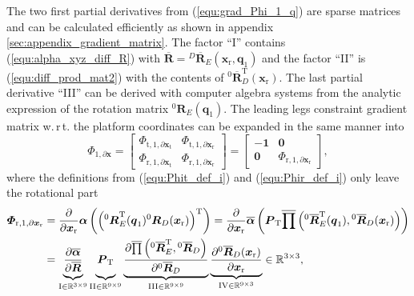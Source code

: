 \documentclass[robotics,article,accept,moreauthors,pdftex]{Definitions/mdpi}
\newcommand{\bm}[1]{\boldsymbol{#1}}
\newcommand{\rotmat}[2]{{{ }^{#1}\boldsymbol{R}}_{#2}}
\newcommand{\rotmato}[2]{{{ }^{#1}\boldsymbol{\overline{R}}}_{#2}}
\newcommand{\transp}[0]{{\mathrm{T}}}
\let\Phi\varPhi
\begin{document}
The two first partial derivatives from (\ref{equ:grad_Phi_1_q}) are sparse matrices and can be calculated efficiently as shown in appendix \ref{sec:appendix_gradient_matrix}.
The factor ``I'' contains (\ref{equ:alpha_xyz_diff_R}) with $\overline{\bm{R}}=\rotmato{D}{E}(\bm{x}_{\mathrm{r}},\bm{q}_1)$ and the factor ``II'' is (\ref{equ:diff_prod_mat2}) with the contents of $\rotmato{0}{D}^\transp(\bm{x}_{\mathrm{r}})$.
The last partial derivative ``III'' can be derived with computer algebra systems from the analytic expression of the rotation matrix $\rotmat{0}{E}(\bm{q}_1)$.
The leading legs constraint gradient matrix w.\,r\,t. the platform coordinates can be expanded in the same manner into
%
\begin{equation}
\bm{\Phi}_{1,\partial\bm{x}}
=
\begin{bmatrix}
\bm{\Phi}_{\mathrm{t},1,\partial\bm{x}_\mathrm{t}} & \bm{\Phi}_{\mathrm{t},1,\partial\bm{x}_\mathrm{r}} \\
\bm{\Phi}_{\mathrm{r},1,\partial\bm{x}_\mathrm{t}} &
\bm{\Phi}_{\mathrm{r},1,\partial\bm{x}_\mathrm{r}}
\end{bmatrix}
=
\begin{bmatrix}
-\bm{1} & \bm{0} \\
\bm{0} &
\bm{\Phi}_{\mathrm{r},1,\partial\bm{x}_\mathrm{r}}
\end{bmatrix},
\label{equ:Phi_1_grad_x}
\end{equation}
%
where the definitions from (\ref{equ:Phit_def_i}) and (\ref{equ:Phir_def_i}) only leave the rotational part
%
\begin{align}
\bm{\Phi}_{\mathrm{r},1,\partial\bm{x}_\mathrm{r}}
&=
\frac{\partial}{\partial \bm{x}_{\mathrm{r}}} \bm{\alpha}\left(\left(\rotmat{0}{E}^\transp(\bm{q}_1) \rotmat{0}{D}(\bm{x}_{\mathrm{r}})\right)^\transp\right) \label{equ:grad_Phi_1_x} 
=
\frac{\partial}{\partial \bm{x}_{\mathrm{r}}} \overline{\bm{\alpha}}\left(
\bm{P}_{\mathrm{T}}
\overline{\prod}\left( \rotmato{0}{E}^\transp(\bm{q}_1), \rotmato{0}{D}(\bm{x}_{\mathrm{r}})\right)\right) \\
&=
\underbrace{
	\vphantom{\frac{\partial \overline{\prod}\left( \rotmato{0}{E}^\transp, \rotmato{0}{D}\right)}{\partial \rotmato{0}{D}}}
    \frac{\partial \overline{\bm{\alpha}}}{\partial \overline{\bm{R}}}
	}_{\mathrm{I} \in {\mathbb{R}}^{3 \times 9}}
\underbrace{
	\vphantom{\frac{\partial \overline{\prod}\left( \rotmato{0}{E}^\transp, \rotmato{0}{D}\right)}{\partial \rotmato{0}{D}}}
    \bm{P}_{\mathrm{T}}
	}_{\mathrm{II} \in {\mathbb{R}}^{9 \times 9}}
\underbrace{
	\frac{\partial \overline{\prod}\left( \rotmato{0}{E}^\transp, \rotmato{0}{D}\right)}{\partial \rotmato{0}{D}}
	}_{\mathrm{III} \in {\mathbb{R}}^{9 \times 9}}
\underbrace{
	\frac{\partial \rotmato{0}{D}(\bm{x}_{\mathrm{r}})}{\partial \bm{x}_{\mathrm{r}}}
	}_{\mathrm{IV} \in {\mathbb{R}}^{9 \times 3}}
\in {\mathbb{R}}^{3 \times 3}, \nonumber
\end{align}
\end{document}
